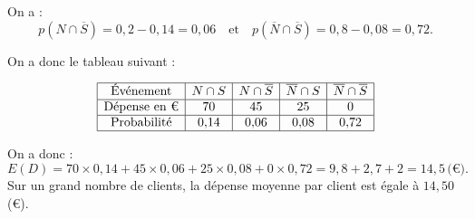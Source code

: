 \documentclass[10pt]{article}
\begin{document}
On a :
\[
p(N \cap \overline{S}) = 0{,}2 - 0{,}14 = 0{,}06 \quad \text{et} \quad p(\overline{N} \cap \overline{S}) = 0{,}8 - 0{,}08 = 0{,}72.
\]

On a donc le tableau suivant :

\[
\begin{array}{|c|c|c|c|c|}
\hline
\text{Événement} & N \cap S & N \cap \overline{S} & \overline{N} \cap S & \overline{N} \cap \overline{S} \\
\hline
\text{Dépense en €} & 70 & 45 & 25 & 0 \\
\hline
\text{Probabilité} & 0{,}14 & 0{,}06 & 0{,}08 & 0{,}72 \\
\hline
\end{array}
\]

On a donc :
\[
E(D) = 70 \times 0{,}14 + 45 \times 0{,}06 + 25 \times 0{,}08 + 0 \times 0{,}72 = 9{,}8 + 2{,}7 + 2 = 14{,}5 \, \text{(€)}.
\]
Sur un grand nombre de clients, la dépense moyenne par client est égale à \(14{,}50\) (€).
\end{document}
